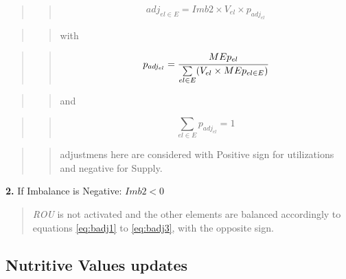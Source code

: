 \documentclass[]{article}
\begin{document}
\begin{quote}
\begin{quote}
\begin{equation}
\label{eq:badj1}
adj_{el \in E} = Imb2 \times V_{el} \times p_{adj_{el}}
\end{equation}
\end{quote}
\end{quote}

\begin{quote}
\begin{quote}
with
\end{quote}
\end{quote}

\begin{quote}
\begin{quote}
\begin{equation}
\label{eq:badj2}
p_{adj_{el}} =\cfrac{MEp_{el}}{\sum \limits_{el \in E} (V_{el} \times MEp_{el \in E})}
\end{equation}
\end{quote}
\end{quote}

\begin{quote}
\begin{quote}
and
\end{quote}
\end{quote}

\begin{quote}
\begin{quote}
\begin{equation}
\label{eq:badj3}
\sum \limits_{el \in E} p_{adj_{el}} = 1
\end{equation}
\end{quote}
\end{quote}

\begin{quote}
\begin{quote}
adjustmens here are considered with Positive sign for utilizations and
negative for Supply.
\end{quote}
\end{quote}

\textbf{2.} If Imbalance is Negative: \(Imb2 < 0\)

\begin{quote}
\emph{ROU} is not activated and the other elements are balanced
accordingly to equations \ref{eq:badj1} to \ref{eq:badj3}, with the
opposite sign.
\end{quote}

\subsection*{Nutritive Values updates}\label{nutritive-values-updates}
\end{document}
